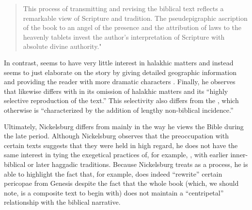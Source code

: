 \begin{quote}
    This process of transmitting and revising the biblical text reflects a remarkable view of Scripture and tradition. The pseudepigraphic ascription of the book to an angel of the presence and the attribution of laws to the heavenly tablets invest the author's interpretation of Scripture with absolute divine authority."\autocite[101]{nickelsburg_stone1984}
\end{quote} 

In contrast, \ga seems to have very little interest in halakhic matters and instead seems to just elaborate on the story by giving detailed geographic information and providing the reader with more dramatic characters \autocite[106]{nickelsburg_stone1984}. Finally, he observes that \lab likewise differs with \jub in its omission of halakhic matters and its ``highly selective reproduction of the text.''\autocite[110]{nickelsburg_stone1984} This selectivity also differs from the \ga, which otherwise is ``characterized by the addition of lengthy non-biblical incidence.''\autocite[110]{nickelsburg_stone1984} 

Ultimately, Nickelsburg differs from \vermes mainly in the way he views the Bible during the late \secondtemple period. Although Nickelsburg observes that the preoccupation with certain texts suggests that they were held in high regard, he does not have the same interest in tying the exegetical practices of, for example, \jub, with earlier inner-biblical or later haggadic traditions. Because Nickelsburg treats \rwb as a process, he is able to highlight the fact that, for example, \firstenoch does indeed ``rewrite'' certain pericopae from Genesis despite the fact that the whole book (which, we should note, is a composite text to begin with) does not maintain a ``centripetal'' relationship with the biblical narrative. 

